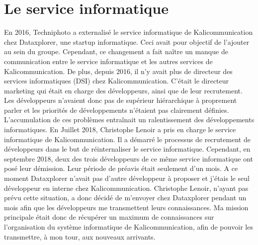 \section{Le service informatique}
En 2016, Techniphoto a externalisé le service informatique de Kalicommunication chez Dataxplorer, une startup informatique. Ceci avait pour objectif de l'ajouter au sein du groupe. Cependant, ce changement a fait naître un manque de communication entre le service informatique et les autres services de Kalicommunication.\newline
De plus, depuis 2016, il n'y avait plus de directeur des services informatiques (DSI) chez Kalicommunication. C'était le directeur marketing qui était en charge des développeurs, ainsi que de leur recrutement. Les développeurs n'avaient donc pas de supérieur hiérarchique à proprement parler et les priorités de développements n'étaient pas clairement définies. L'accumulation de ces problèmes entraînait un ralentissement des développements informatiques.\newline
En Juillet 2018, Christophe Lenoir a pris en charge le service informatique de Kalicommunication. Il a démarré le processus de recrutement de développeurs dans le but de réinternaliser le service informatique.\newline
Cependant, en septembre 2018, deux des trois développeurs de ce même service informatique ont posé leur démission. Leur période de préavis était seulement d'un mois. A ce moment Dataxplorer n'avait pas d'autre développeur à proposer et j'étais le seul développeur en interne chez Kalicommunication. Christophe Lenoir, n'ayant pas prévu cette situation, a donc décidé de m'envoyer chez Dataxplorer pendant un mois afin que les développeurs me transmettent leurs connaissances.\newline
Ma mission principale était donc de récupérer un maximum de connaissances sur l'organisation du système informatique de Kalicommunication, afin de pouvoir les transmettre, à mon tour, aux nouveaux arrivants.